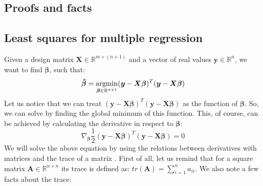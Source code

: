 \begin{appendices}

\chapter{Proofs and facts}

\section{Least squares for multiple regression}
\label{app:least}

Given a design matrix $\boldsymbol{X} \in \mathbb{R}^{m \times (n+1)}$ and a vector of real values $\boldsymbol{y} \in \mathbb{R}^{n}$, we want to find $\boldsymbol{\beta}$, such that:
\begin{equation}\label{eq:least0}
    \boldsymbol{\hat{\beta}} = \operatorname*{argmin}_{\boldsymbol{\beta} \in \mathbb{R}^{n+1}}(\boldsymbol{y}-\boldsymbol{X}\boldsymbol{\beta})^T(\boldsymbol{y}-\boldsymbol{X}\boldsymbol{\beta})
\end{equation}
Let us notice that we can treat $(\boldsymbol{y}-\boldsymbol{X}\boldsymbol{\beta})^T(\boldsymbol{y}-\boldsymbol{X}\boldsymbol{\beta})$ as the function of $\boldsymbol{\beta}$. So, we can solve  by finding the global minimum of this function. This, of course, can be achieved by calculating the derivative in respect to $\boldsymbol{\beta}$:
\begin{equation}\label{eq:least1}
    \nabla_{\boldsymbol{\beta}} \frac{1}{2}(\boldsymbol{y}-\boldsymbol{X}\boldsymbol{\beta})^T(\boldsymbol{y}-\boldsymbol{X}\boldsymbol{\beta}) = 0
\end{equation}
We will solve the above equation by using the relations between derivatives with matrices and the trace of a matrix \citep{LRV}. First of all, let us remind that for a square matrix $\boldsymbol{A} \in \mathbb{R}^{n \times n}$ its trace is defined as: $tr(\boldsymbol{A})= \sum\limits_{i=1}^{n}a_{ii}$. We also note a few facts about the trace:


\end{appendices}
